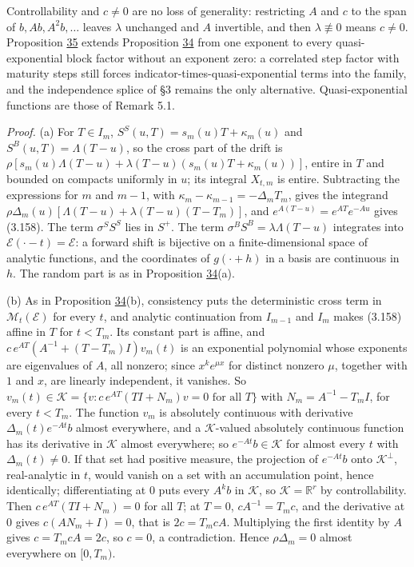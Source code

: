 \documentclass[11pt]{article}
\begin{document}
Controllability and \(c\neq0\) are no loss of generality: restricting \(A\) and \(c\) to the span of \(b,Ab,A^2b,\dots\) leaves \(\lambda\) unchanged and \(A\) invertible, and then \(\lambda\not\equiv0\) means \(c\neq0\). Proposition \hyperref[res:Proposition-35]{35} extends Proposition \hyperref[res:Proposition-34]{34} from one exponent to every quasi-exponential block factor without an exponent zero: a correlated step factor with maturity steps still forces indicator-times-quasi-exponential terms into the family, and the independence splice of \cite{gellert2021short} §3 remains the only alternative. Quasi-exponential functions are those of \cite{bjork2001existence} Remark 5.1.

\emph{Proof.} (a) For \(T\in I_m\), \(S^S(u,T)=s_m(u)T+\kappa_m(u)\) and \(S^B(u,T)=\Lambda(T-u)\), so the cross part of the drift is \(\rho[s_m(u)\Lambda(T-u)+\lambda(T-u)(s_m(u)T+\kappa_m(u))]\), entire in \(T\) and bounded on compacts uniformly in \(u\); its integral \(X_{t,m}\) is entire. Subtracting the expressions for \(m\) and \(m-1\), with \(\kappa_m-\kappa_{m-1}=-\Delta_mT_m\), gives the integrand \(\rho\Delta_m(u)[\Lambda(T-u)+\lambda(T-u)(T-T_m)]\), and \(e^{A(T-u)}=e^{AT}e^{-Au}\) gives (3.158). The term \(\sigma^SS^S\) lies in \(S^+\). The term \(\sigma^BS^B=\lambda\Lambda(T-u)\) integrates into \(\mathcal E(\cdot-t)=\mathcal E\): a forward shift is bijective on a finite-dimensional space of analytic functions, and the coordinates of \(g(\cdot+h)\) in a basis are continuous in \(h\). The random part is as in Proposition \hyperref[res:Proposition-34]{34}(a).

(b) As in Proposition \hyperref[res:Proposition-34]{34}(b), consistency puts the deterministic cross term in \(\mathcal M_t(\mathcal E)\) for every \(t\), and analytic continuation from \(I_{m-1}\) and \(I_m\) makes (3.158) affine in \(T\) for \(t<T_m\). Its constant part is affine, and \(c\,e^{AT}(A^{-1}+(T-T_m)I)v_m(t)\) is an exponential polynomial whose exponents are eigenvalues of \(A\), all nonzero; since \(x^ke^{\mu x}\) for distinct nonzero \(\mu\), together with \(1\) and \(x\), are linearly independent, it vanishes. So \(v_m(t)\in\mathcal K=\{v:c\,e^{AT}(TI+N_m)v=0\text{ for all }T\}\) with \(N_m=A^{-1}-T_mI\), for every \(t<T_m\). The function \(v_m\) is absolutely continuous with derivative \(\Delta_m(t)e^{-At}b\) almost everywhere, and a \(\mathcal K\)-valued absolutely continuous function has its derivative in \(\mathcal K\) almost everywhere; so \(e^{-At}b\in\mathcal K\) for almost every \(t\) with \(\Delta_m(t)\neq0\). If that set had positive measure, the projection of \(e^{-At}b\) onto \(\mathcal K^\perp\), real-analytic in \(t\), would vanish on a set with an accumulation point, hence identically; differentiating at \(0\) puts every \(A^kb\) in \(\mathcal K\), so \(\mathcal K=\mathbb R^r\) by controllability. Then \(c\,e^{AT}(TI+N_m)=0\) for all \(T\); at \(T=0\), \(cA^{-1}=T_mc\), and the derivative at \(0\) gives \(c(AN_m+I)=0\), that is \(2c=T_mcA\). Multiplying the first identity by \(A\) gives \(c=T_mcA=2c\), so \(c=0\), a contradiction. Hence \(\rho\Delta_m=0\) almost everywhere on \([0,T_m)\).
\end{document}
